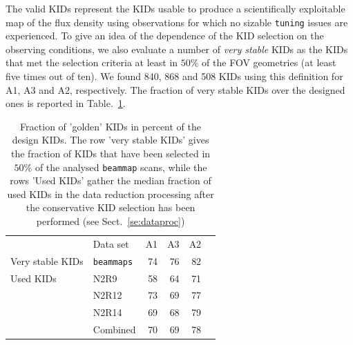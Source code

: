 The valid KIDs represent the KIDs
usable to produce a scientifically exploitable map of the flux
density using observations for which no sizable {\tt tuning}
issues are experienced. %
{\lp To give an idea of the dependence of the KID selection on the
observing conditions,} we also
evaluate a number of \emph{very stable} KIDs as the KIDs that met the
selection criteria at least in {\lp $50\%$} of the FOV geometries (at least
five times out of {\lp ten}). We
found 840, 868 and 508 KIDs using this definition for A1, A3 and A2,
respectively. The fraction of very stable KIDs over the designed ones
is reported in Table.~\ref{tab:eta_used}.

\begin{table}[!htbp]
  \centering
  \caption[]{Fraction of 'golden' KIDs in percent of the design
  KIDs. The row 'very stable KIDs' gives the fraction of KIDs that have been selected
  in {\lp $50\%$} of the analysed {\tt beammap} scans, while the rows 'Used KIDs' gather
  the median fraction of used KIDs in the data reduction processing
  after the conservative KID selection has been performed (see Sect.~\ref{se:dataproc})}
  \label{tab:eta_used}
  \begin{tabular}{llrrrr}
    \hline\hline
    \noalign{\smallskip}
    &  Data set   & A1      &   A3    &     A2 \\
    \noalign{\smallskip}
    \hline
    \noalign{\smallskip}
    Very stable KIDs & {\tt beammaps} & 74  &  76  &  82  \\
    \hline
    \noalign{\smallskip}
    Used KIDs  & N2R9     & 58 &  64  & 71 \\
               & N2R12    & 73 &  69  & 77 \\
               & N2R14    & 69 &  68  & 79 \\
               & Combined & 70 &  69  & 78 \\
    \hline
  \end{tabular}
\end{table}

